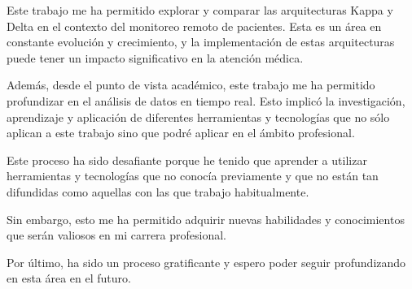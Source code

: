 Este trabajo me ha permitido explorar y comparar las arquitecturas Kappa y Delta en el contexto del monitoreo remoto de pacientes.
Esta es un área en constante evolución y crecimiento, y la implementación de estas arquitecturas puede tener un impacto significativo en la atención médica.\newline

Además, desde el punto de vista académico, este trabajo me ha permitido profundizar en el análisis de datos en tiempo real.
Esto implicó la investigación, aprendizaje y aplicación de diferentes herramientas y tecnologías que no sólo aplican 
a este trabajo sino que podré aplicar en el ámbito profesional.\newline

Este proceso ha sido desafiante porque he tenido que aprender a utilizar herramientas y tecnologías que no conocía previamente 
y que no están tan difundidas como aquellas con las que trabajo habitualmente.\newline

Sin embargo, esto me ha permitido adquirir nuevas habilidades y conocimientos que serán valiosos en mi carrera profesional.\newline

Por último, ha sido un proceso gratificante y espero poder seguir profundizando en esta área en el futuro.